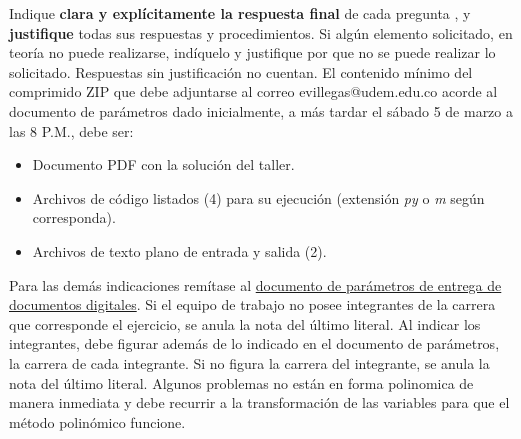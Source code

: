 \documentclass[12pt]{article}
\begin{document}
Indique \textbf{clara y explícitamente la respuesta final} de cada pregunta
, y \textbf{justifique} todas sus respuestas y procedimientos. Si algún elemento solicitado, en teoría no puede realizarse, indíquelo y justifique por que no se puede realizar lo solicitado. Respuestas sin justificación no cuentan.
    El contenido mínimo del comprimido ZIP que debe adjuntarse al correo evillegas@udem.edu.co acorde al documento de parámetros dado inicialmente, a más tardar el sábado 5 de marzo a las 8 P.M., debe ser:
    \begin{itemize}
    \item Documento PDF con la solución del taller.
    \item Archivos de código listados (4) para su ejecución (extensión   \textit{py} o \textit{m} según corresponda).
    \item Archivos de texto plano de entrada y salida (2).
    \end{itemize}
Para las demás indicaciones remítase al \href{https://www.dropbox.com/s/noko8eysm8une33/CondicionesEntrega.pdf?dl=0}{documento de parámetros de entrega de documentos digitales}. %
Si el equipo de trabajo no posee integrantes de la carrera que corresponde el ejercicio, se anula la nota del último literal. Al indicar los integrantes, debe figurar además de lo indicado en el documento de parámetros, la carrera de cada integrante. Si no figura la carrera del integrante, se anula la nota del último literal. Algunos problemas no están en forma polinomica de manera inmediata y debe recurrir a la transformación de las variables para que el método polinómico funcione. %
\vspace{1cm}
\end{document}
